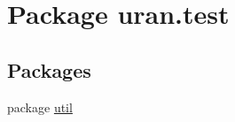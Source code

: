 \hypertarget{namespaceuran_1_1test}{}\section{Package uran.\+test}
\label{namespaceuran_1_1test}
\subsection*{Packages}
\begin{DoxyCompactItemize}
\item 
package \hyperlink{namespaceuran_1_1test_1_1util}{util}
\end{DoxyCompactItemize}

